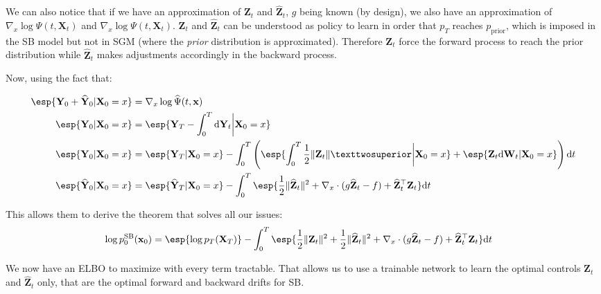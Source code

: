 \documentclass{article}
\begin{document}
We can also notice that if we have an approximation of $\mathbf{Z}_t$ and $\widehat{\mathbf{Z}}_t$, $g$ being known (by design), we also have an approximation of $\nabla_x\log\widehat\Psi(t,\mathbf{X}_t)$ and $\nabla_x\log\Psi(t,\mathbf{X}_t)$. $\mathbf{Z}_t$ and $\widehat{\mathbf{Z}}_t$ can be understood as policy to learn in order that $p_T$ reaches $p_\mathrm{prior}$, which is imposed in the SB model but not in SGM (where the \textit{prior} distribution is approximated). Therefore $\mathbf{Z}_t$ force the forward process to reach the prior distribution while $\widehat{\mathbf{Z}}_t$ makes adjustments accordingly in the backward process.

Now, using the fact that:

\begin{align}
\esp{\mathbf{Y}_0 + \widehat{\mathbf{Y}}_0|\mathbf{X}_0 = x} & =  \nabla_x\log\widehat\Psi(t,\mathbf{x})\\
\esp{\mathbf{Y}_0|\mathbf{X}_0 = x} &= \esp{\mathbf{Y}_T - \int_0^T \dint \mathbf{Y}_t \bigg\rvert\mathbf{X}_0 = x}\\
\esp{\mathbf{Y}_0|\mathbf{X}_0 = x} & = \esp{\mathbf{Y}_T|\mathbf{X}_0 = x} -\int_0^T \pars{\esp{\int_0^T \frac{1}{2}\|\mathbf{Z}_t\|²\bigg\rvert\mathbf{X}_0 = x} + \esp{\mathbf{Z}_t \dint \mathbf{W}_t|\mathbf{X}_0 = x}}\dint t \\
\esp{\widehat{\mathbf{Y}}_0|\mathbf{X}_0 = x} & = \esp{\widehat{\mathbf{Y}}_T|\mathbf{X}_0 = x} - \int_0^T \esp{\frac{1}{2}\|\widehat{\mathbf{Z}}_t\|^2 + \nabla_x \cdot (g\widehat{\mathbf{Z}}_t - f) + \widehat{\mathbf{Z}}_t^\top \mathbf{Z}_t}\dint t
\end{align}


This allows them to derive the theorem that solves all our issues:
\begin{equation}\label{eq:logpSB}
\begin{aligned}
\log p_0^\mathrm{SB}(\mathbf{x}_0) & = \esp{\log p_T(\mathbf{X}_T)}- \int_0^T \esp{\frac{1}{2}\|\mathbf{Z}_t\|^2 + \frac{1}{2}\|\widehat{\mathbf{Z}}_t\|^2 + \nabla_x \cdot (g\widehat{\mathbf{Z}}_t - f) + \widehat{\mathbf{Z}}_t^\top \mathbf{Z}_t} \dint t
\end{aligned}
\end{equation}

We now have an ELBO to maximize with every term tractable.
That allows us to use a trainable network to learn the optimal controls $\mathbf{Z}_t$ and $\widehat{\mathbf{Z}}_t$ only, that are the optimal forward and backward drifts for SB.
\end{document}
